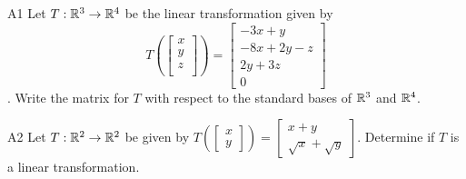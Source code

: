 \documentclass{sbgLAquiz}
\begin{document}
\begin{problem}{A1}
Let $T: \mathbb{R}^3\rightarrow \mathbb{R}^4$ be the linear transformation given by $$T\left(\begin{bmatrix} x \\ y \\ z \\  \end{bmatrix} \right) = \begin{bmatrix} -3x+y \\ -8x+2y-z \\ 2y+3z \\ 0 \end{bmatrix}$$.  Write the matrix for $T$ with respect to the standard bases of $\mathbb{R}^3$ and $\mathbb{R}^4$.
\end{problem}
\newpage

\begin{problem}{A2}
Let $T: \mathbb{R}^2 \rightarrow \mathbb{R}^2$ be given by $T\left(\begin{bmatrix}x \\ y  \end{bmatrix} \right) = \begin{bmatrix} x+y \\ \sqrt{x}+\sqrt{y} \end{bmatrix}$.  Determine if $T$ is a linear transformation.
\end{problem}
\end{document}
